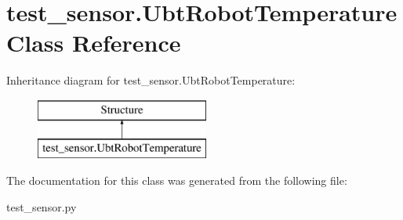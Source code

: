 \hypertarget{classtest__sensor_1_1UbtRobotTemperature}{\section{test\+\_\+sensor.\+Ubt\+Robot\+Temperature Class Reference}
\label{classtest__sensor_1_1UbtRobotTemperature}
}
Inheritance diagram for test\+\_\+sensor.\+Ubt\+Robot\+Temperature\+:\begin{figure}[H]
\begin{center}
\leavevmode
\includegraphics[height=2.000000cm]{classtest__sensor_1_1UbtRobotTemperature}
\end{center}
\end{figure}


The documentation for this class was generated from the following file\+:\begin{DoxyCompactItemize}
\item 
test\+\_\+sensor.\+py\end{DoxyCompactItemize}
